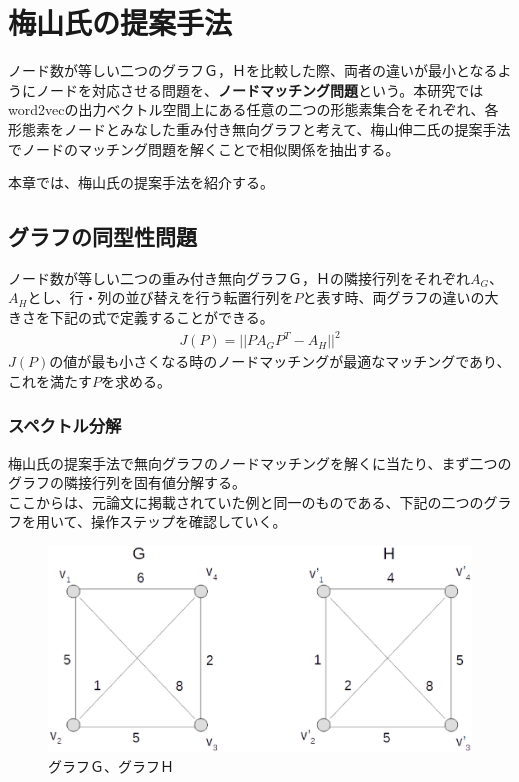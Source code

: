 \chapter{梅山氏の提案手法}
\label{s_ts}
ノード数が等しい二つのグラフＧ，Ｈを比較した際、両者の違いが最小となるようにノードを対応させる問題を、\textbf{ノードマッチング問題}という。本研究ではword2vecの出力ベクトル空間上にある任意の二つの形態素集合をそれぞれ、各形態素をノードとみなした重み付き無向グラフと考えて、梅山伸二氏の提案手法\cite{s_umeyama}でノードのマッチング問題を解くことで相似関係を抽出する。

本章では、梅山氏の提案手法を紹介する。\cite{s_umeyama}

\section{グラフの同型性問題}
ノード数が等しい二つの重み付き無向グラフＧ，Ｈの隣接行列をそれぞれ$A_G$、$A_H$とし、行・列の並び替えを行う転置行列を$P$と表す時、両グラフの違いの大きさを下記の式で定義することができる。
\begin{eqnarray}
  \label{jp_p2}
  J(P)=||PA_GP^T-A_H||^2
\end{eqnarray}
$J(P)$の値が最も小さくなる時のノードマッチングが最適なマッチングであり、これを満たす$P$を求める。

\newpage

\subsection{スペクトル分解}
梅山氏の提案手法で無向グラフのノードマッチングを解くに当たり、まず二つのグラフの隣接行列を固有値分解する。\\
ここからは、元論文に掲載されていた例と同一のものである、下記の二つのグラフを用いて、操作ステップを確認していく。
\begin{figure}[h]
  \centering
  \includegraphics[width=12.5cm]{../images/gh.eps}
  \caption{グラフＧ、グラフＨ}
\end{figure}


